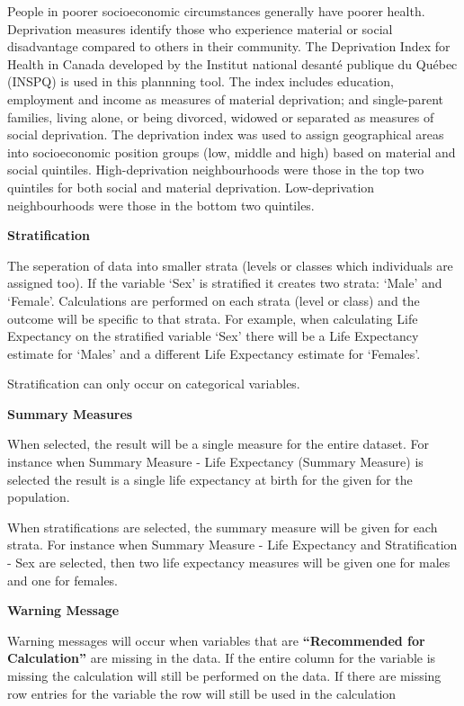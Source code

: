 \documentclass[]{book}
\begin{document}
People in poorer socioeconomic circumstances generally have poorer
health. Deprivation measures identify those who experience material or
social disadvantage compared to others in their community. The
Deprivation Index for Health in Canada developed by the Institut
national desanté publique du Québec (INSPQ)\citep{INSPQ2000} is used in
this plannning tool. The index includes education, employment and income
as measures of material deprivation; and single-parent families, living
alone, or being divorced, widowed or separated as measures of social
deprivation. The deprivation index was used to assign geographical areas
into socioeconomic position groups (low, middle and high) based on
material and social quintiles. High-deprivation neighbourhoods were
those in the top two quintiles for both social and material deprivation.
Low-deprivation neighbourhoods were those in the bottom two quintiles.

\textbf{Stratification}

The seperation of data into smaller strata (levels or
classes which individuals are assigned too). If the variable `Sex' is
stratified it creates two strata: `Male' and `Female'. Calculations are
performed on each strata (level or class) and the outcome will be
specific to that strata. For example, when calculating Life Expectancy
on the stratified variable `Sex' there will be a Life Expectancy
estimate for `Males' and a different Life Expectancy estimate for
`Females'.

Stratification can only occur on categorical variables.

\textbf{Summary Measures}

When selected, the result will be a single measure for
the entire dataset. For instance when Summary Measure - Life Expectancy
(Summary Measure) is selected the result is a single life expectancy at
birth for the given for the population.

When stratifications are selected, the summary
measure will be given for each strata. For instance when Summary Measure
- Life Expectancy and Stratification - Sex are selected, then two life
expectancy measures will be given one for males and one for females.

\textbf{Warning Message}

Warning messages will occur when variables that are
\textbf{``Recommended for Calculation''} are missing in the data. If the
entire column for the variable is missing the calculation will still be
performed on the data. If there are missing row entries for the variable
the row will still be used in the calculation
\end{document}
